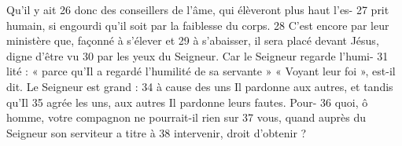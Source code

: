 Qu'il y ait	 
26	 	donc des conseillers de l'âme, qui élèveront plus haut l'es-	 
27	 	prit humain, si engourdi qu'il soit par la faiblesse du corps.	 
28	 	C'est encore par leur ministère que, façonné à s'élever et	 
29	 	à s'abaisser, il sera placé devant Jésus, digne d'être vu	 
30	 	par les yeux du Seigneur. Car le Seigneur regarde l'humi-	 
31	 	lité : « parce qu'Il a regardé l'humilité de sa servante »
« Voyant leur foi », est-il dit. Le Seigneur est grand :	 
34	 	à cause des uns Il pardonne aux autres, et tandis qu'Il	 
35	 	agrée les uns, aux autres Il pardonne leurs fautes. Pour-	 
36	 	quoi, ô homme, votre compagnon ne pourrait-il rien sur	 
37	 	vous, quand auprès du Seigneur son serviteur a titre à	 
38	 	intervenir, droit d'obtenir ?
